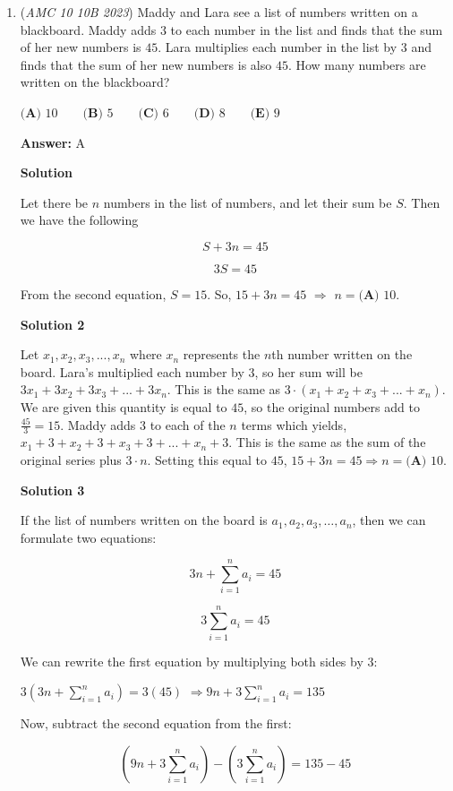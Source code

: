 \begin{enumerate}
 


	\item (\textit{AMC 10 10B 2023}) Maddy and Lara see a list of numbers written on a blackboard. Maddy adds $3$ to each number in the list and finds that the sum of her new numbers is $45$. Lara multiplies each number in the list by $3$ and finds that the sum of her new numbers is also $45$. How many numbers are written on the blackboard?


 $\textbf{(A) }10\qquad\textbf{(B) }5\qquad\textbf{(C) }6\qquad\textbf{(D) }8\qquad\textbf{(E) }9$

 \textbf{Answer: }A



\textbf{Solution}

Let there be $n$ numbers in the list of numbers, and let their sum be $S$. Then we have the following

 
 \[S+3n=45\]

 \[3S=45\]

 From the second equation, $S=15$. So, $15+3n=45$ $\Rightarrow$ $n=\boxed{\textbf{(A) }10}.$




\textbf{Solution 2}

Let $x_1,x_2,x_3,...,x_n$ where $x_n$ represents the $n$th number written on the board. Lara's multiplied each number by $3$, so her sum will be $3x_1+3x_2+3x_3+...+3x_n$. This is the same as $3\cdot (x_1+x_2+x_3+...+x_n)$. We are given this quantity is equal to $45$, so the original numbers add to $\frac{45}{3}=15$. Maddy adds $3$ to each of the $n$ terms which yields, $x_1+3+x_2+3+x_3+3+...+x_n+3$. This is the same as the sum of the original series plus $3 \cdot n$. Setting this equal to $45$, $15+3n=45 \Rightarrow n =\boxed{\textbf{(A) }10}.$




\textbf{Solution 3}

If the list of numbers written on the board is $a_1, a_2, a_3, \ldots, a_n$, then we can formulate two equations:

 
 \[3n + \sum_{i=1}^{n} a_i = 45\]

 \[3 \sum_{i=1}^{n} a_i = 45\]

 We can rewrite the first equation by multiplying both sides by $3$:

 $3(3n + \sum_{i=1}^{n} a_i) = 3(45)$
$\Rightarrow 9n + 3 \sum_{i=1}^{n} a_i = 135$

 Now, subtract the second equation from the first:

 
 \[(9n + 3 \sum_{i=1}^{n} a_i) - (3 \sum_{i=1}^{n} a_i) = 135 - 45\]


\end{enumerate}
